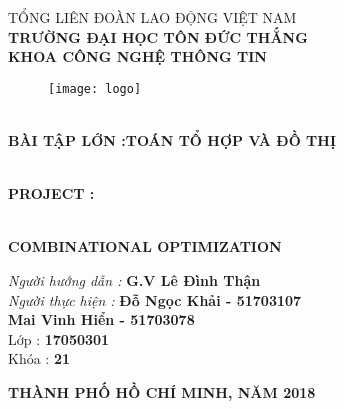 \documentclass{article}
\begin{document}
	\fontsize{14pt}{12pt}\selectfont
	\begin{center}
		\fontsize{14pt}{11pt}\selectfont
		TỔNG LIÊN ĐOÀN LAO ĐỘNG VIỆT NAM
		\textbf{\\TRƯỜNG ĐẠI HỌC TÔN ĐỨC THẮNG}
		\textbf{\\KHOA CÔNG NGHỆ THÔNG TIN}
	\begin{figure}[!ht]
		\centering
		\texttt{[image: logo]}
	\end{figure}
		\fontsize{16pt}{12pt}\selectfont
		\textbf{\\BÀI TẬP LỚN :TOÁN TỔ HỢP VÀ ĐỒ THỊ}
		\vspace{1cm}
		\begin{center}
			\fontsize{22pt}{11pt}\selectfont
			\textbf{\\PROJECT :}
			
			\textbf{\\COMBINATIONAL OPTIMIZATION}
		\end{center}
		\vspace{2cm}
		\begin{flushright}
			\fontsize{14pt}{12pt}\selectfont
			\textit{Người hướng dẫn : }
			\textbf{G.V Lê Đình Thận }
			\vspace{0.2cm}
			\textit{\\Người thực hiện : }
			\textbf{Đỗ Ngọc Khải - 51703107}
			\vspace{0.2cm}
			\textbf{\\Mai Vinh Hiển - 51703078}
			\vspace{0.2cm}
			\\Lớp : \textbf{17050301}
			\vspace{0.2cm}
			\\Khóa : \textbf{21}
		\end{flushright}
		\vspace{1cm}
		\centering
		\textbf{THÀNH PHỐ HỒ CHÍ MINH, NĂM 2018}
	\end{center}
\newpage
	\fontsize{14pt}{12pt}\selectfont
\end{document}
